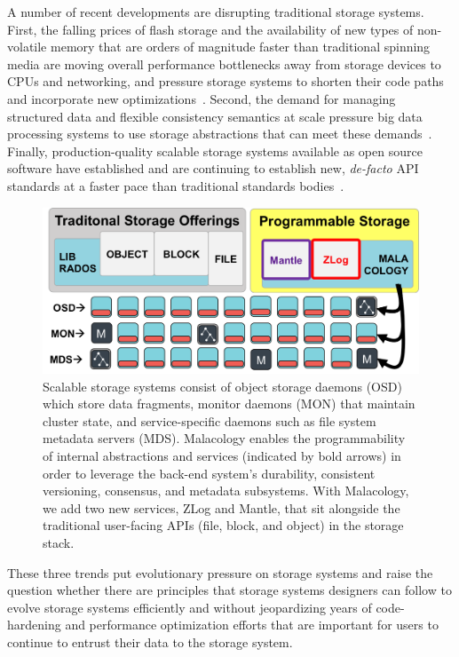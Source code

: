 \documentclass[10pt,twocolumn]{article}
\begin{document}
A number of recent developments are disrupting traditional storage systems.
First, the falling prices of flash storage and the availability of new types of
non-volatile memory that are orders of magnitude faster than traditional
spinning media are moving overall performance bottlenecks away from storage
devices to CPUs and networking, and pressure storage systems to shorten their
code paths and incorporate new
optimizations~\cite{gray_tape_2007,gray_flash_2008}. Second, the demand for
managing structured data and flexible consistency semantics at scale pressure
big data processing systems to use storage abstractions that can meet these
demands~\cite{apache_contributors_parquet_2014}. Finally, production-quality
scalable storage systems available as open source software have established and
are continuing to establish new, \emph{de-facto} API standards at a faster pace
than traditional standards
bodies~\cite{snia_implementing_2014,linux_foundation_kinetic_2015}.

\begin{figure}[tb]
\centering
\includegraphics{figures/overview.png}

\caption{Scalable storage systems consist of object storage daemons (OSD) which
store data fragments, monitor daemons (MON) that maintain cluster state, and
service-specific daemons such as file system metadata servers (MDS). Malacology
enables the programmability of internal abstractions and services (indicated by
bold arrows) in order to leverage the back-end system's durability, consistent
versioning, consensus, and metadata subsystems.  With Malacology, we add two
new services, ZLog and Mantle, that sit alongside the traditional user-facing
APIs (file, block, and object) in the storage stack.  \label{fig:overview}}
\end{figure}

These three trends put evolutionary pressure on storage systems and raise the
question whether there are principles that storage systems designers can follow
to evolve storage systems efficiently and without jeopardizing years of
code-hardening and performance optimization efforts that are important for
users to continue to entrust their data to the storage system.
\end{document}
